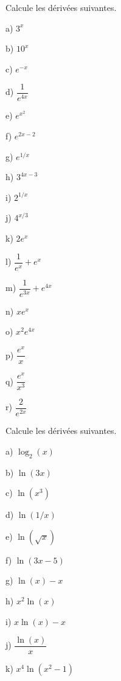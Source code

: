 \documentclass[a4paper,12pt,singlepage]{report}
\begin{document}
\begin{exercice}
Calcule les dérivées suivantes.
\par \setlength{\columnseprule}{0 pt}
          \begin{minipage}[t]{\linewidth}
          \begin{multicols}{5}
a) \(3^x\)

b) \(10^x\)

c) \(e^{-x}\)

d) \(\dfrac{1}{e^{4x}}\)

e) \(e^{x^2}\)

f) \(e^{2x-2}\)

g) \(e^{1/x}\)

h) \(3^{4x-3}\)

i) \(2^{1/x}\)

j) \(4^{x/3}\)

k) \(2e^x\)

l) \(\dfrac{1}{e^{x}}+e^{x}\)

m) \(\dfrac{1}{e^{3x}}+e^{4x}\)

n) \(xe^x\)

o) \(x^2e^{4x}\)

p) \(\dfrac{e^x}{x}\)

q) \(\dfrac{e^x}{x^3}\)

r) \(\dfrac{2}{e^{2x}}\)


\end{multicols}\end{minipage}
\end{exercice}

\begin{exercice}
Calcule les dérivées suivantes.

\par \setlength{\columnseprule}{0 pt}
          \begin{minipage}[t]{\linewidth}
          \begin{multicols}{5}

a) \(\log_2(x)\)

b) \(\ln(3x)\)

c) \(\ln(x^3)\)

d) \(\ln(1/x)\)

e) \(\ln(\sqrt{x})\)

f) \(\ln(3x-5)\)

g) \(\ln(x)-x\)

h) \(x^2\ln(x)\)

i) \(x\ln(x)-x\)

j) \(\dfrac{\ln(x)}{x}\)

k) \(x^4\ln(x^2-1)\)


\end{multicols}\end{minipage}
\end{exercice}
\end{document}
